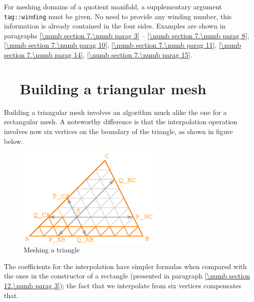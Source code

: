 For meshing domains of a quotient manifold, a supplementary argument
{\small\tt\textcolor{tag}{tag}::winding} must be given.
No need to provide any winding number, this information is already contained in the four sides.
Examples are shown in paragraphs \ref{\numb section 7.\numb parag 3} --
\ref{\numb section 7.\numb parag 8}, \ref{\numb section 7.\numb parag 10},
\ref{\numb section 7.\numb parag 11}, \ref{\numb section 7.\numb parag 14},
\ref{\numb section 7.\numb parag 15}.


\section{~~Building a triangular mesh}\label{\numb section 12.\numb parag 4}

Building a triangular mesh involves an algorithm much alike the one for a rectangular mesh.
A noteworthy difference is that the interpolation operation involves now six vertices on
the boundary of the triangle, as shown in figure below.

\begin{figure}[ht] \centering
  \includegraphics[width=70mm]{fig-triangle}
  \caption{Meshing a triangle}
  \label{\numb section 12.\numb fig 2}
\end{figure}

The coefficients for the interpolation have simpler formulas when compared with the ones in the
constructor of a rectangle (presented in paragraph \ref{\numb section 12.\numb parag 3});
the fact that we interpolate from six vertices compensates that.

